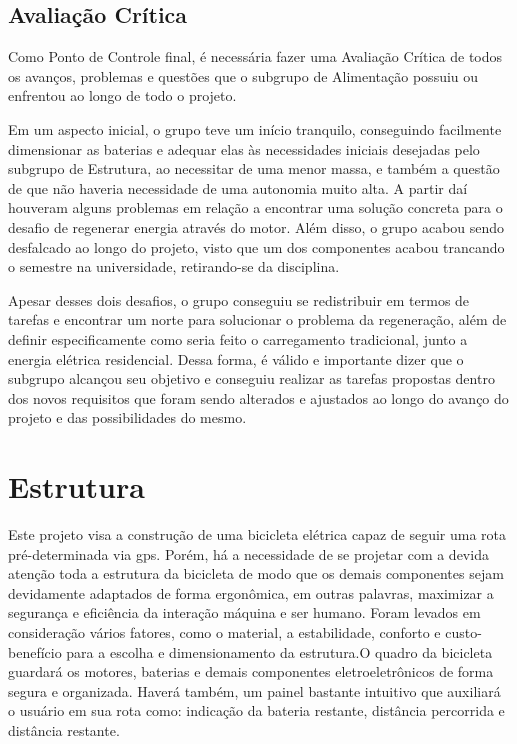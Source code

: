 \subsection{Avaliação Crítica}
	Como Ponto de Controle final, é necessária fazer uma Avaliação Crítica de todos os avanços, problemas e questões que o subgrupo de Alimentação possuiu ou enfrentou ao longo de todo o projeto. 
	
	Em um aspecto inicial, o grupo teve um início tranquilo, conseguindo facilmente dimensionar as baterias e adequar elas às necessidades iniciais desejadas pelo subgrupo de Estrutura, ao necessitar de uma menor massa, e também a questão de que não haveria necessidade de uma autonomia muito alta. A partir daí houveram alguns problemas em relação a encontrar uma solução concreta para o desafio de regenerar energia através do motor. Além disso, o grupo acabou sendo desfalcado ao longo do projeto, visto que um dos componentes acabou trancando o semestre na universidade, retirando-se da disciplina. 
	
	Apesar desses dois desafios, o grupo conseguiu se redistribuir em termos de tarefas e encontrar um norte para solucionar o problema da regeneração, além de definir especificamente como seria feito o carregamento tradicional, junto a energia elétrica residencial. Dessa forma, é válido e importante dizer que o subgrupo alcançou seu objetivo e conseguiu realizar as tarefas propostas dentro dos novos requisitos que foram sendo alterados e ajustados ao longo do avanço do projeto e das possibilidades do mesmo. 


  \section{Estrutura}
  Este projeto visa a construção de uma bicicleta elétrica capaz de seguir uma rota pré-determinada via gps. Porém, há a necessidade de se projetar com a devida atenção toda a estrutura da bicicleta de modo que os demais componentes sejam devidamente adaptados de forma ergonômica, em outras palavras, maximizar a segurança e eficiência da interação máquina e ser humano.
Foram levados em consideração vários fatores, como o material, a estabilidade, conforto e custo-benefício para a escolha e dimensionamento da estrutura.O quadro da bicicleta guardará os motores, baterias e demais componentes eletroeletrônicos de forma segura e organizada. Haverá também, um painel bastante intuitivo que auxiliará o usuário em sua rota como: indicação da bateria restante, distância percorrida e distância restante.
